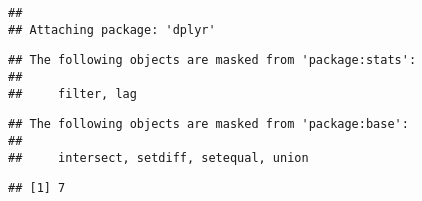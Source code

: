 \documentclass[
]{article}
\newenvironment{Shaded}{\begin{snugshade}}{\end{snugshade}}
\newcommand{\CommentTok}[1]{\textcolor[rgb]{0.56,0.35,0.01}{\textit{#1}}}
\newcommand{\FunctionTok}[1]{\textcolor[rgb]{0.00,0.00,0.00}{#1}}
\newcommand{\NormalTok}[1]{#1}
\newcommand{\OtherTok}[1]{\textcolor[rgb]{0.56,0.35,0.01}{#1}}
\newcommand{\SpecialCharTok}[1]{\textcolor[rgb]{0.00,0.00,0.00}{#1}}
\newcommand{\StringTok}[1]{\textcolor[rgb]{0.31,0.60,0.02}{#1}}
\begin{document}
\begin{verbatim}
## 
## Attaching package: 'dplyr'
\end{verbatim}

\begin{verbatim}
## The following objects are masked from 'package:stats':
## 
##     filter, lag
\end{verbatim}

\begin{verbatim}
## The following objects are masked from 'package:base':
## 
##     intersect, setdiff, setequal, union
\end{verbatim}

\begin{Shaded}
\end{Shaded}

\begin{verbatim}
## [1] 7
\end{verbatim}

\begin{Shaded}
\end{Shaded}
\end{document}
